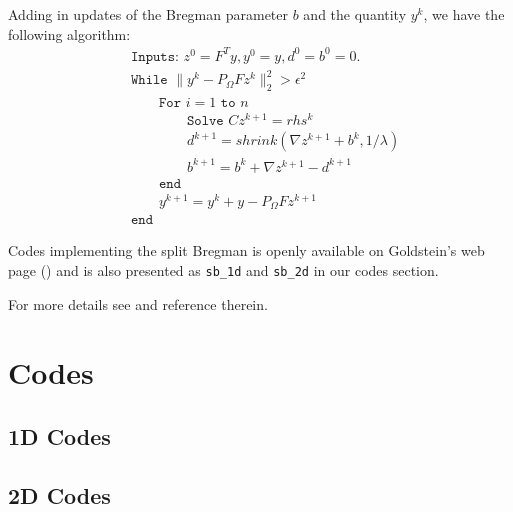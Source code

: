 \documentclass[11pt, oneside]{article}   %
\newcommand{\norm}[1]{\lVert #1 \rVert}
\begin{document}
\begin{appendices}
Adding in updates of the Bregman parameter $b$ and the quantity $y^{k}$, we have the following algorithm:
\begin{align*}
&\texttt{Inputs: } z^0 = F^T y, y^0 = y, d^0 = b^0 = 0. \\
&\texttt{While } \norm{y^{k} - P_\Omega F z^k}^2_2 > \epsilon^2  \\
&\mbox{}\qquad \texttt{For }i = 1 \texttt{ to }n \\
&\mbox{}\qquad\qquad \texttt{Solve } Cz^{k+1} = rhs^k \\
&\mbox{}\qquad\qquad d^{k+1} = shrink(\nabla z^{k+1} + b^k, 1/\lambda) \\
&\mbox{}\qquad\qquad b^{k+1} = b^k + \nabla z^{k+1} - d^{k+1} \\
&\mbox{}\qquad \texttt{end} \\
&\mbox{}\qquad y^{k+1} = y^{k} + y - P_\Omega F z^{k+1} \\
&\texttt{end}
\end{align*}

Codes implementing the split Bregman is openly available on Goldstein's web page (\!\!\cite{goldsteinsplitcode}) and is also presented as \verb|sb_1d| and \verb|sb_2d| in our codes section.

For more details see \cite{goldstein2009split} and reference therein.

\section{Codes}\label{Codes}
\subsection{1D Codes}









\subsection{2D Codes}






\end{appendices}

%
% 


%

\end{document}
